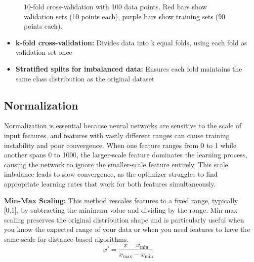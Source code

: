 \begin{figure}[h]
  \caption{10-fold cross-validation with 100 data points. Red bars show validation sets (10 points each), purple bars show training sets (90 points each).}
  \label{fig:kfold-cv}
\end{figure}

\begin{itemize}
    \item \textbf{k-fold cross-validation:} Divides data into k equal folds, using each fold as validation set once
    \item \textbf{Stratified splits for imbalanced data:} Ensures each fold maintains the same class distribution as the original dataset
\end{itemize}


\subsection{Normalization}

Normalization is essential because neural networks are sensitive to the scale of input features, and features with vastly different ranges can cause training instability and poor convergence. When one feature ranges from 0 to 1 while another spans 0 to 1000, the larger-scale feature dominates the learning process, causing the network to ignore the smaller-scale feature entirely. This scale imbalance leads to slow convergence, as the optimizer struggles to find appropriate learning rates that work for both features simultaneously.

\textbf{Min-Max Scaling:} This method rescales features to a fixed range, typically [0,1], by subtracting the minimum value and dividing by the range. Min-max scaling preserves the original distribution shape and is particularly useful when you know the expected range of your data or when you need features to have the same scale for distance-based algorithms.
\begin{equation}
x' = \frac{x - x_{\min}}{x_{\max} - x_{\min}}
\end{equation}

